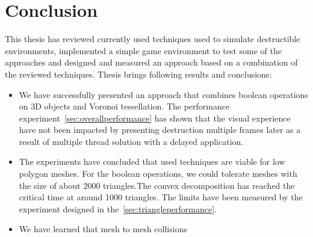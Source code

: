 \chapter*{Conclusion}

This thesis has reviewed currently used techniques used to simulate destructible environments, implemented a simple game environment to test some of the approaches and designed and measured an approach based on a combination of the reviewed techniques. Thesis brings following results and conclusions:

\begin{itemize}
\item We have successfully presented an approach that combines boolean operations on 3D objects and Voronoi tessellation. The performance experiment~\cref{sec:overallperformance} has shown that the visual experience have not been impacted by presenting destruction multiple frames later as a result of multiple thread solution with a delayed application.

\item The experiments have concluded that used techniques are viable for low polygon meshes. For the boolean operations, we could tolerate meshes with the size of about 2000 triangles.The convex decomposition has reached the critical time at around 1000 triangles. The limits have been measured by the experiment designed in the~\cref{sec:triangleperformance}.

\item We have learned that mesh to mesh collisions
\end{itemize}


